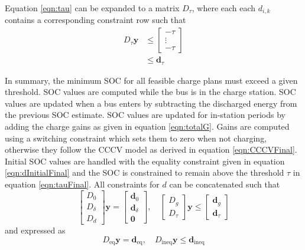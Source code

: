 Equation \ref{eqn:tau} can be expanded to a matrix $D_\tau$, where each each $d_{i,k}$ contains a corresponding constraint row such that
\begin{equation}\label{eqn:tauFinal}
	\begin{aligned}
		D_\tau\mathbf{y} & \le \begin{bmatrix}-\tau \\ \vdots \\ -\tau \end{bmatrix} \\
		       & \le \mathbf{d}_\tau
	\end{aligned}
\end{equation}
\par In summary, the minimum SOC for all feasible charge plans must exceed a given threshold.  SOC values are computed while the bus is in the charge station.  SOC values are updated when a bus enters by subtracting the discharged energy from the previous SOC estimate. SOC values are updated for in-station periods by adding the charge gains as given in equation \ref{eqn:totalG}.  Gains are computed using a switching constraint which sets them to zero when not charging, otherwise they follow the CCCV model as derived in equation \ref{eqn:CCCVFinal}. Initial SOC values are handled with the equality constraint given in equation \ref{eqn:dInitialFinal} and the SOC is constrained to remain above the threshold $\tau$ in equation \ref{eqn:tauFinal}. All constraints for $d$ can be concatenated such that 
\begin{equation}
	\begin{bmatrix}
	D_0 \\
	D_\delta \\
	D_d
	\end{bmatrix} \mathbf{y} = 
	\begin{bmatrix}
		\mathbf{d}_0 \\
		\mathbf{d}_\delta \\
		\mathbf{0}
		\end{bmatrix}, \quad \begin{bmatrix} D_g \\ D_\tau \end{bmatrix}\mathbf{y} \le \begin{bmatrix} \mathbf{d}_g \\ \mathbf{d}_\tau \end{bmatrix}
\end{equation}
and expressed as 
\begin{equation}
	D_{\text{eq}}\mathbf{y} = \mathbf{d}_{\text{eq}}, \quad D_{\text{ineq}} \mathbf{y} \le \mathbf{d}_{\text{ineq}}
\end{equation}
